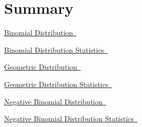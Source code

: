 \documentclass[10pt,]{book}
\numberwithin{equation}{section}
\begin{document}
\section[{Summary}]{Summary}\label{section-49}
\hypertarget{p-997}{}%
\hyperlink{BinomialProbabilityFunction}{Binomial Distribution~}%
\par
\hypertarget{p-998}{}%
\hyperlink{BinomialStatistics}{Binomial Distribution Statistics~}%
\par
\hypertarget{p-999}{}%
\hyperlink{GeometricProbabilityFunction}{Geometric Distribution~}%
\par
\hypertarget{p-1000}{}%
\hyperlink{GeometricStatistics}{Geometric Distribution Statistics~}%
\par
\hypertarget{p-1001}{}%
\hyperlink{NegativeBinomialProbabilityFunction}{Negative Binomial Distribution~}%
\par
\hypertarget{p-1002}{}%
\hyperlink{NegativeBinomialStatistics}{Negative Binomial Distribution Statistics~}%
%
%
\typeout{************************************************}
\typeout{************************************************}
%
\end{document}
